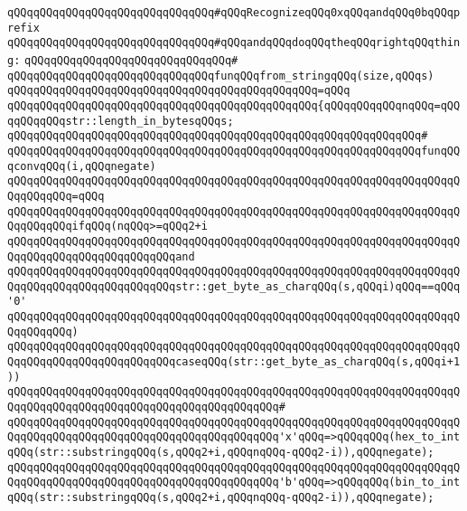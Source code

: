 \verb|qQQqqQQqqQQqqQQqqQQqqQQqqQQqqQQq#qQQqRecognizeqQQq0xqQQqandqQQq0bqQQqprefix|\newline
\verb|qQQqqQQqqQQqqQQqqQQqqQQqqQQqqQQq#qQQqandqQQqdoqQQqtheqQQqrightqQQqthing:|\newline
\verb|qQQqqQQqqQQqqQQqqQQqqQQqqQQqqQQq#|\newline
\verb|qQQqqQQqqQQqqQQqqQQqqQQqqQQqqQQqfunqQQqfrom_stringqQQq(size,qQQqs)|\newline
\verb|qQQqqQQqqQQqqQQqqQQqqQQqqQQqqQQqqQQqqQQqqQQqqQQq=qQQq|\newline
\verb|qQQqqQQqqQQqqQQqqQQqqQQqqQQqqQQqqQQqqQQqqQQqqQQq{qQQqqQQqqQQqnqQQq=qQQqqQQqqQQqstr::length_in_bytesqQQqs;|\newline
\verb|qQQqqQQqqQQqqQQqqQQqqQQqqQQqqQQqqQQqqQQqqQQqqQQqqQQqqQQqqQQqqQQq#|\newline
\verb|qQQqqQQqqQQqqQQqqQQqqQQqqQQqqQQqqQQqqQQqqQQqqQQqqQQqqQQqqQQqqQQqfunqQQqconvqQQq(i,qQQqnegate)|\newline
\verb|qQQqqQQqqQQqqQQqqQQqqQQqqQQqqQQqqQQqqQQqqQQqqQQqqQQqqQQqqQQqqQQqqQQqqQQqqQQqqQQq=qQQq|\newline
\verb|qQQqqQQqqQQqqQQqqQQqqQQqqQQqqQQqqQQqqQQqqQQqqQQqqQQqqQQqqQQqqQQqqQQqqQQqqQQqqQQqifqQQq(nqQQq>=qQQq2+i|\newline
\verb|qQQqqQQqqQQqqQQqqQQqqQQqqQQqqQQqqQQqqQQqqQQqqQQqqQQqqQQqqQQqqQQqqQQqqQQqqQQqqQQqqQQqqQQqqQQqqQQqand|\newline
\verb|qQQqqQQqqQQqqQQqqQQqqQQqqQQqqQQqqQQqqQQqqQQqqQQqqQQqqQQqqQQqqQQqqQQqqQQqqQQqqQQqqQQqqQQqqQQqqQQqstr::get_byte_as_charqQQq(s,qQQqi)qQQq==qQQq'0'|\newline
\verb|qQQqqQQqqQQqqQQqqQQqqQQqqQQqqQQqqQQqqQQqqQQqqQQqqQQqqQQqqQQqqQQqqQQqqQQqqQQqqQQq)|\newline
\verb|qQQqqQQqqQQqqQQqqQQqqQQqqQQqqQQqqQQqqQQqqQQqqQQqqQQqqQQqqQQqqQQqqQQqqQQqqQQqqQQqqQQqqQQqqQQqqQQqcaseqQQq(str::get_byte_as_charqQQq(s,qQQqi+1))|\newline
\verb|qQQqqQQqqQQqqQQqqQQqqQQqqQQqqQQqqQQqqQQqqQQqqQQqqQQqqQQqqQQqqQQqqQQqqQQqqQQqqQQqqQQqqQQqqQQqqQQqqQQqqQQqqQQqqQQq#|\newline
\verb|qQQqqQQqqQQqqQQqqQQqqQQqqQQqqQQqqQQqqQQqqQQqqQQqqQQqqQQqqQQqqQQqqQQqqQQqqQQqqQQqqQQqqQQqqQQqqQQqqQQqqQQqqQQqqQQq'x'qQQq=>qQQqqQQq(hex_to_intqQQq(str::substringqQQq(s,qQQq2+i,qQQqnqQQq-qQQq2-i)),qQQqnegate);|\newline
\verb|qQQqqQQqqQQqqQQqqQQqqQQqqQQqqQQqqQQqqQQqqQQqqQQqqQQqqQQqqQQqqQQqqQQqqQQqqQQqqQQqqQQqqQQqqQQqqQQqqQQqqQQqqQQqqQQq'b'qQQq=>qQQqqQQq(bin_to_intqQQq(str::substringqQQq(s,qQQq2+i,qQQqnqQQq-qQQq2-i)),qQQqnegate);|\newline
